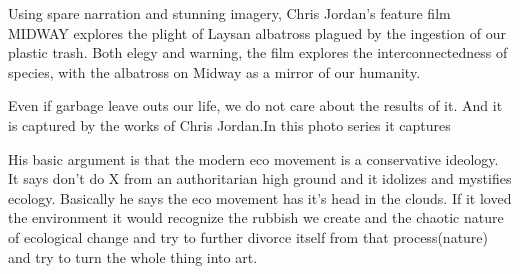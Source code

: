 Using spare narration and stunning imagery, Chris Jordan's feature film MIDWAY explores the plight of Laysan albatross plagued by the ingestion of our plastic trash. Both elegy and warning, the film explores the interconnectedness of species, with the albatross on Midway as a mirror of our humanity.

Even if garbage leave outs our life, we do not care about the results of it. And it is captured by the works of Chris Jordan.In this photo series it captures 




 \cite{vafin2012zizek}

His basic argument is that the modern eco movement is a conservative ideology. It says don't do X from an authoritarian high ground and it idolizes and mystifies ecology. Basically he says the eco movement has it's head in the clouds. If it loved the environment it would recognize the rubbish we create and the chaotic nature of ecological change and try to further divorce itself from that process(nature) and try to turn the whole thing into art. 

